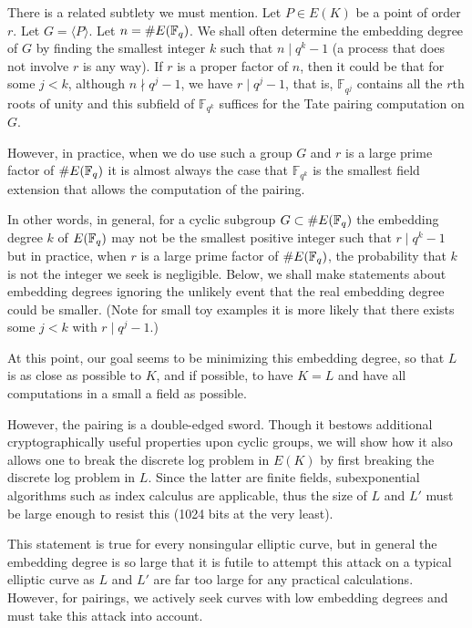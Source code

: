There is a related subtlety we must mention.
Let $P \in E(K)$ be a point of order $r$.
Let $G = \langle P \rangle$.
Let $n = \#E(\mathbb{F}_q)$.
We shall often determine the embedding degree of $G$
by finding the smallest integer $k$ such that $n \mid q^k - 1$
(a process that does not involve $r$ is any way).
If $r$ is a proper factor of $n$,
then it could be that for some $j < k$, although $n \nmid q^j - 1$,
we have $r \mid q^j - 1$, that is,
$\mathbb{F}_{q^j}$ contains all the $r$th roots of unity and this
subfield of $\mathbb{F}_{q^k}$ suffices for
the Tate pairing computation on $G$.

However, in practice, when we do use such a group $G$ and
$r$ is a large prime factor of $\#E(\mathbb{F}_q)$ it is almost always the case that
$\mathbb{F}_{q^k}$ is the smallest field extension that allows the computation
of the pairing.

In other words, in general, for a cyclic subgroup $G \subset \#E(\mathbb{F}_q)$
the embedding degree $k$ of $E(\mathbb{F}_q)$
may not be the smallest positive integer such that $r \mid q^k - 1$ but
in practice, when $r$ is a large prime factor of $\#E(\mathbb{F}_q)$,
the probability that $k$ is not the integer we seek is negligible.
Below, we shall make statements
about embedding degrees ignoring the unlikely event that the
real embedding degree could be smaller.
(Note for small toy examples it is more likely that there exists
some $j < k$ with $r \mid q^j - 1$.)

At this point, our goal seems to be minimizing this embedding degree,
so that $L$ is as close as possible to $K$, and if possible,
to have $K = L$ and have all computations in a
small a field as possible.

However, the pairing is a double-edged sword. Though it
bestows additional cryptographically useful properties upon cyclic groups,
we will show how it also allows one to break the discrete log problem in $E(K)$
by first breaking the discrete log problem in $L$.
Since the latter are finite fields, subexponential
algorithms such as index calculus are applicable, thus the size of $L$ and
$L'$ must be large enough to resist this (1024 bits at the very least).

This statement is true for every nonsingular elliptic curve, but in general
the embedding degree is so large that it is futile to attempt this attack
on a typical elliptic curve as $L$ and $L'$ are far too large for any
practical calculations.
However, for pairings, we actively seek curves with low embedding
degrees and must take this attack into account.

